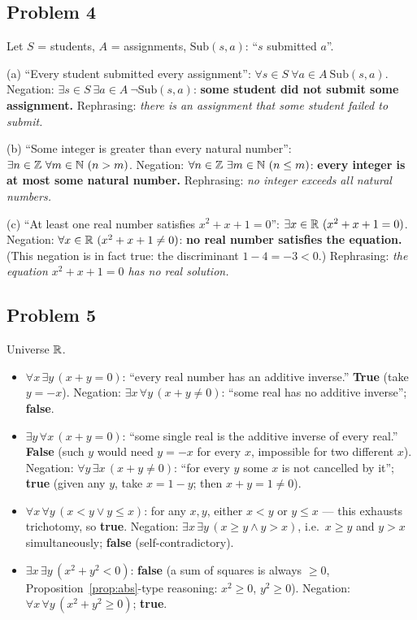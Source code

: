 \subsection*{Problem 4}
Let $S$ = students, $A$ = assignments, $\mathrm{Sub}(s,a)$: ``$s$ submitted $a$''.

(a) ``Every student submitted every assignment'': $\forall s\in S\ \forall a\in A\ \mathrm{Sub}(s,a)$. Negation: $\exists s\in S\ \exists a\in A\ \neg\mathrm{Sub}(s,a)$: \textbf{some student did not submit some assignment.} Rephrasing: \emph{there is an assignment that some student failed to submit.}

(b) ``Some integer is greater than every natural number'': $\exists n\in\mathbb{Z}\ \forall m\in\mathbb{N}\ (n>m)$. Negation: $\forall n\in\Z\ \exists m\in\N\ (n\le m)$: \textbf{every integer is at most some natural number.} Rephrasing: \emph{no integer exceeds all natural numbers.}

(c) ``At least one real number satisfies $x^2+x+1=0$'': $\exists x\in\mathbb{R}\ (x^2+x+1=0)$. Negation: $\forall x\in\R\ (x^2+x+1\ne0)$: \textbf{no real number satisfies the equation.} (This negation is in fact true: the discriminant $1-4=-3<0$.) Rephrasing: \emph{the equation $x^2+x+1=0$ has no real solution.}

\subsection*{Problem 5}
Universe $\mathbb{R}$.
\begin{itemize}
	\item[(a)] $\forall x\,\exists y\,(x+y=0)$: ``every real number has an additive inverse.'' \textbf{True} (take $y=-x$). Negation: $\exists x\,\forall y\,(x+y\ne0)$: ``some real has no additive inverse''; \textbf{false}.
	\item[(b)] $\exists y\,\forall x\,(x+y=0)$: ``some single real is the additive inverse of every real.'' \textbf{False} (such $y$ would need $y=-x$ for every $x$, impossible for two different $x$). Negation: $\forall y\,\exists x\,(x+y\ne0)$: ``for every $y$ some $x$ is not cancelled by it''; \textbf{true} (given any $y$, take $x=1-y$; then $x+y=1\ne0$).
	\item[(c)] $\forall x\,\forall y\,(x<y\vee y\le x)$: for any $x,y$, either $x<y$ or $y\le x$ — this exhausts trichotomy, so \textbf{true}. Negation: $\exists x\,\exists y\,(x\ge y\wedge y>x)$, i.e.\ $x\ge y$ and $y>x$ simultaneously; \textbf{false} (self-contradictory).
	\item[(d)] $\exists x\,\exists y\,(x^2+y^2<0)$: \textbf{false} (a sum of squares is always $\ge0$, Proposition~\ref{prop:abs}-type reasoning: $x^2\ge0$, $y^2\ge0$). Negation: $\forall x\,\forall y\,(x^2+y^2\ge0)$; \textbf{true}.
\end{itemize}

